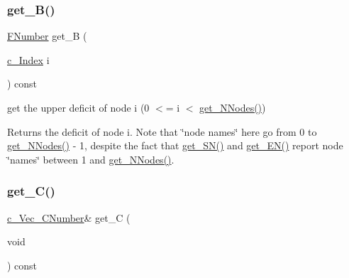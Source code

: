 \subsubsection{\texorpdfstring{get\+\_\+\+B()}{get\_B()}\hspace{0.1cm}{\footnotesize\ttfamily [2/2]}}
{\footnotesize\ttfamily \mbox{\hyperlink{class_s_m_spp__di__unipi__it_1_1_m_c_f_block_aeea3e5951d222b2a8e57de1b4246a909}{F\+Number}} get\+\_\+B (\begin{DoxyParamCaption}\item[{\mbox{\hyperlink{class_s_m_spp__di__unipi__it_1_1_m_c_f_block_aee6156e2ce80720d57a082d80f39d8cc}{c\+\_\+\+Index}}}]{i }\end{DoxyParamCaption}) const\hspace{0.3cm}{\ttfamily [inline]}}



get the upper deficit of node i (0 $<$= i $<$ \mbox{\hyperlink{class_s_m_spp__di__unipi__it_1_1_m_c_f_block_afff9080606a5612d33ba20c39d663839}{get\+\_\+\+N\+Nodes()}}) 

Returns the deficit of node i. Note that \char`\"{}node names\char`\"{} here go from 0 to \mbox{\hyperlink{class_s_m_spp__di__unipi__it_1_1_m_c_f_block_afff9080606a5612d33ba20c39d663839}{get\+\_\+\+N\+Nodes()}} -\/ 1, despite the fact that \mbox{\hyperlink{class_s_m_spp__di__unipi__it_1_1_m_c_f_block_a48ce277b5dac05d54aa2281fa4595c7b}{get\+\_\+\+S\+N()}} and \mbox{\hyperlink{class_s_m_spp__di__unipi__it_1_1_m_c_f_block_a34619412f7c801aadfa0b083a6efda36}{get\+\_\+\+E\+N()}} report node \char`\"{}names\char`\"{} between 1 and \mbox{\hyperlink{class_s_m_spp__di__unipi__it_1_1_m_c_f_block_afff9080606a5612d33ba20c39d663839}{get\+\_\+\+N\+Nodes()}}. \mbox{\label{class_s_m_spp__di__unipi__it_1_1_m_c_f_block_afc7d07e6f9631921f29b236c0c79d800}} 
\subsubsection{\texorpdfstring{get\+\_\+\+C()}{get\_C()}}
{\footnotesize\ttfamily \mbox{\hyperlink{class_s_m_spp__di__unipi__it_1_1_m_c_f_block_ad42538e79f9abbdf18061bccc05edcd6}{c\+\_\+\+Vec\+\_\+\+C\+Number}}\& get\+\_\+C (\begin{DoxyParamCaption}\item[{void}]{ }\end{DoxyParamCaption}) const\hspace{0.3cm}{\ttfamily [inline]}}



